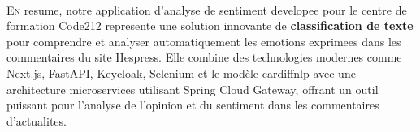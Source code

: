 \ \\

\lettrine[nindent=0em, slope=.5em] {\color{Eblue}E}{n} resume, notre application d'analyse de sentiment developee pour le centre de formation Code212 represente une solution innovante de \textbf{classification de texte} pour comprendre et analyser automatiquement les emotions exprimees dans les commentaires du site Hespress. Elle combine des technologies modernes comme Next.js, FastAPI, Keycloak, Selenium et le modèle cardiffnlp avec une architecture microservices utilisant Spring Cloud Gateway, offrant un outil puissant pour l'analyse de l'opinion et du sentiment dans les commentaires d'actualites.
